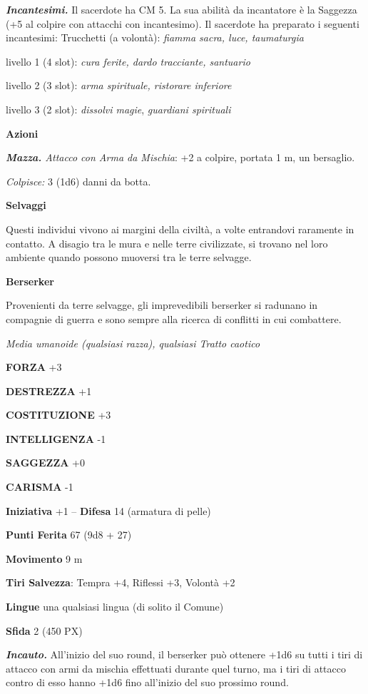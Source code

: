 \begin{multicols}{2}
\textit{\textbf{Incantesimi.}} Il sacerdote ha CM 5. La sua abilità da incantatore è la Saggezza (+5 al colpire con attacchi con incantesimo). Il sacerdote ha preparato i seguenti incantesimi: Trucchetti (a volontà): \textit{fiamma sacra, luce, taumaturgia}

livello 1 (4 slot): \textit{cura ferite, dardo tracciante, santuario}

livello 2 (3 slot): \textit{arma spirituale, ristorare inferiore}

livello 3 (2 slot): \textit{dissolvi magie}, \textit{guardiani spirituali}

\textbf{Azioni}

\textit{\textbf{Mazza.} Attacco con Arma da Mischia}: +2 a colpire, portata 1 m, un bersaglio.

\textit{Colpisce:} 3 (1d6) danni da botta.


\medskip\textbf{Selvaggi}

Questi individui vivono ai margini della civiltà, a volte entrandovi raramente in contatto. A disagio tra le mura e nelle terre civilizzate, si trovano nel loro ambiente quando possono muoversi tra le terre selvagge.

\medskip\textbf{Berserker}

Provenienti da terre selvagge, gli imprevedibili berserker si radunano in compagnie di guerra e sono sempre alla ricerca di conflitti in cui combattere.

\textit{Media umanoide (qualsiasi razza), qualsiasi Tratto caotico}

\textbf{FORZA} +3

\textbf{DESTREZZA} +1

\textbf{COSTITUZIONE} +3

\textbf{INTELLIGENZA} -1

\textbf{SAGGEZZA} +0

\textbf{CARISMA} -1

\textbf{Iniziativa} +1 -- \textbf{Difesa} 14 (armatura di pelle)

\textbf{Punti Ferita} 67 (9d8 + 27)

\textbf{Movimento} 9 m

\textbf{Tiri Salvezza}: Tempra +4, Riflessi +3, Volontà +2

\textbf{Lingue} una qualsiasi lingua (di solito il Comune)

\textbf{Sfida} 2 (450 PX)

\textit{\textbf{Incauto.}} All'inizio del suo round, il berserker può ottenere +1d6 su tutti i tiri di attacco con armi da mischia effettuati durante quel turno, ma i tiri di attacco contro di esso hanno +1d6 fino all'inizio del suo prossimo round.


\end{multicols}
